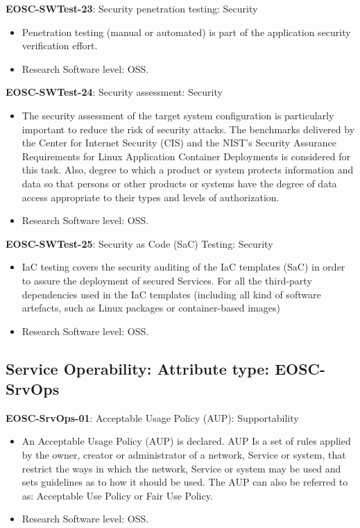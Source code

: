 \textbf{EOSC-SWTest-23}: Security penetration testing: Security

\begin{itemize}
    \item Penetration testing (manual or automated) is part of the application security verification effort.~\cite{orviz_fernandez_eosc-synergy_2020}
    \item Research Software level: OSS.
\end{itemize}

\textbf{EOSC-SWTest-24}: Security assessment: Security

\begin{itemize}
    \item The security assessment of the target system configuration is particularly important to reduce the risk of security attacks. The benchmarks delivered by the Center for Internet Security (CIS) and the NIST's Security Assurance Requirements for Linux Application Container Deployments is considered for this task. Also, degree to which a product or system protects information and data so that persons or other products or
systems have the degree of data access appropriate to their types and levels of authorization.~\cite{iso_25010_2011_2017,orviz_fernandez_eosc-synergy_2020}
    \item Research Software level: OSS.
\end{itemize}

\textbf{EOSC-SWTest-25}: Security as Code (SaC) Testing: Security

\begin{itemize}
    \item IaC testing covers the security auditing of the IaC templates (SaC) in order to assure the deployment of secured Services. For all the third-party dependencies used in the IaC templates (including all kind of software artefacts, such as Linux packages or container-based images)~\cite{orviz_fernandez_eosc-synergy_2020}
    \item Research Software level: OSS.
\end{itemize}

\subsection{Service Operability: Attribute type: EOSC-SrvOps}

\textbf{EOSC-SrvOps-01}: Acceptable Usage Policy (AUP): Supportability

\begin{itemize}
    \item An Acceptable Usage Policy (AUP) is declared. AUP Is a set of rules applied by the owner, creator or administrator of a network, Service or system, that restrict the ways in which the network, Service or system may be used and sets guidelines as to how it should be used. The AUP can also be referred to as: Acceptable Use Policy or Fair Use Policy.~\cite{orviz_fernandez_eosc-synergy_2020}
    \item Research Software level: OSS.
\end{itemize}

